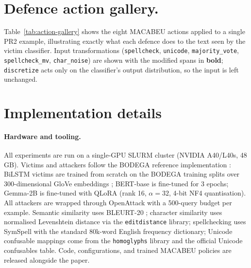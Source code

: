 \documentclass[11pt]{article}
\begin{document}
\begin{table}[h]
  \centering
  
  \caption{Per-task data statistics for the four BODEGA credibility tasks.}
  \label{tab:tasks-stats}
\end{table}

\section{Defence action gallery.}
\label{sec:appendix-action-gallery}
Table~\ref{tab:action-gallery} shows the eight MACABEU actions applied to a single \textsc{PR2} example, illustrating exactly what each defence does to the text seen by the victim classifier. Input transformations (\texttt{spellcheck}, \texttt{unicode}, \texttt{majority\_vote}, \texttt{spellcheck\_mv}, \texttt{char\_noise}) are shown with the modified spans in \textbf{bold}; \texttt{discretize} acts only on the classifier's output distribution, so the input is left unchanged.



\section{Implementation details}
\label{sec:appendix-impl}

\paragraph{Hardware and tooling.} All experiments are run on a single-GPU SLURM cluster (NVIDIA A40/L40s, 48\,GB). Victims and attackers follow the BODEGA reference implementation \citep{verifying_robustness}: BiLSTM victims are trained from scratch on the BODEGA training splits over 300-dimensional GloVe embeddings \citep{Pennington2014}; BERT-base \citep{Devlin2019} is fine-tuned for 3 epochs; Gemma-2B \citep{Gemma2024} is fine-tuned with QLoRA \citep{Dettmers2023} (rank 16, $\alpha=32$, 4-bit NF4 quantisation). All attackers are wrapped through OpenAttack \citep{Zeng2021} with a 500-query budget per example. Semantic similarity uses BLEURT-20 \citep{Sellam2020, Pu2021}; character similarity uses normalised Levenshtein distance \citep{1965} via the \texttt{editdistance} library; spellchecking uses SymSpell with the standard 80k-word English frequency dictionary; Unicode confusable mappings come from the \texttt{homoglyphs} library and the official Unicode confusables table. Code, configurations, and trained MACABEU policies are released alongside the paper.
\end{document}
